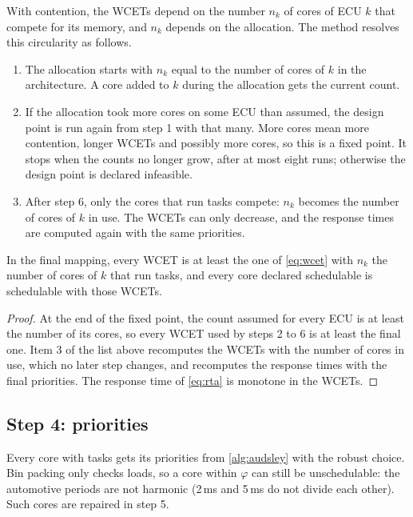 With contention, the WCETs depend on the number $n_k$ of cores of ECU $k$
that compete for its memory, and $n_k$ depends on the allocation. The
method resolves this circularity as follows.
\begin{enumerate}
\item The allocation starts with $n_k$ equal to the number of cores of $k$
in the architecture. A core added to $k$ during the allocation gets the
current count.
\item If the allocation took more cores on some ECU than assumed, the
design point is run again from step 1 with that many. More cores mean more
contention, longer WCETs and possibly more cores, so this is a fixed
point. It stops when the counts no longer grow, after at most eight runs;
otherwise the design point is declared infeasible.
\item After step 6, only the cores that run tasks compete: $n_k$ becomes
the number of cores of $k$ in use. The WCETs can only decrease, and the
response times are computed again with the same priorities.
\end{enumerate}

\begin{proposition}[Contention]
\label{prop:contention}
In the final mapping, every WCET is at least the one of \cref{eq:wcet}
with $n_k$ the number of cores of $k$ that run tasks, and every core
declared schedulable is schedulable with those WCETs.
\end{proposition}
\begin{proof}
At the end of the fixed point, the count assumed for every ECU is at
least the number of its cores, so every WCET used by steps 2 to 6 is at
least the final one. Item 3 of the list above recomputes the WCETs with the
number of cores in use, which no later step changes, and recomputes the
response times with the final priorities. The response time of
\cref{eq:rta} is monotone in the WCETs.
\end{proof}

\subsection{Step 4: priorities}

Every core with tasks gets its priorities from \cref{alg:audsley} with the
robust choice. Bin packing only checks loads, so a core within $\varphi$
can still be unschedulable: the automotive periods are not harmonic
(2\,ms and 5\,ms do not divide each other). Such cores are repaired in
step 5.

